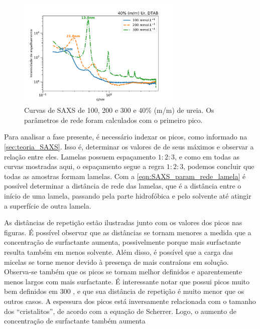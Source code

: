 	\begin{figure}[h]
		\centering
		\includegraphics[width=0.7\textwidth]{imagens/saxs/DTAB_conc}
		\caption{Curvas de SAXS de \DTAB{} 100, 200 e 300 \mM{} e 40\% (m/m) de ureia. Os parâmetros de rede foram calculados com o primeiro pico.}
		\label{fig:SAXS_dtabconc}
	\end{figure}
	
	Para analisar a fase presente, é necessário indexar os picos, como informado na \autoref{sec:teoria_SAXS}. Isso é, determinar os valores de \q{} de seus máximos e observar a relação entre eles. Lamelas possuem espaçamento \(1:2:3\), e como em todas as curvas mostradas aqui, o espaçamento segue a regra \(1:2:3\), podemos concluir que todas as amostras formam lamelas. Com a \autoref{eqn:SAXS_param_rede_lamela} é possível determinar a distância de rede das lamelas, que é a distância entre o início de uma lamela, passando pela parte hidrofóbica e pelo solvente até atingir a superfície de outra lamela.
	

	As distâncias de repetição estão ilustradas junto com os valores dos picos nas figuras. É possível observar que as distâncias se tornam menores a medida que a concentração de surfactante aumenta, possivelmente porque mais surfactante resulta também em menos solvente. Além disso, é possível que a carga das micelas se torne menor devido à presença de mais contraíons em solução. Observa-se também que os picos se tornam melhor definidos e aparentemente menos largos com mais surfactante. É interessante notar que \DTAB{} possui picos muito bem definidos em 300 \mM, e que sua distância de repetição é muito menor que os outros casos. A espessura dos picos está inversamente relacionada com o tamanho dos ``cristalitos'', de acordo com a equação de Scherrer. Logo, o aumento de concentração de surfactante também aumenta 

